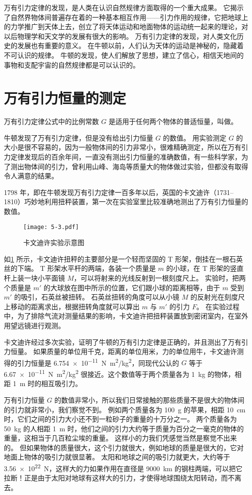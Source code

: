 万有引力定律的发现，是人类在认识自然规律方面取得的一个重大成果。
它揭示了自然界物体间普遍存在着的一种基本相互作用——引力作用的规律，它把地球上的力学推广到天体上去，创立了将天体运动和地面物体的运动统一起来的理论，对以后物理学和天文学的发展有很大的影响。
万有引力定律的发现，对人类文化历史的发展也有重要的意义。
在牛顿以前，人们认为天体的运动是神秘的，隐藏着不可认识的规律。
牛顿的发现，使人们解放了思想，建立了信心，相信天地间的事物和支配宇宙的自然规律都是可以认识的。

\section{万有引力恒量的测定}
万有引力定律公式中的比例常数 $G$ 是适用于任何两个物体的普适恒量，叫做。

牛顿发现了万有引力定律，但是没有给出引力恒量 $G$ 的数值。
用实验测定 $G$ 的大小是很不容易的，因为一般物体间的引力非常小，很难精确测定，所以在万有引力定律发现后的百余年间，一直没有测出引力恒量的准确数值，有一些科学家，为了测出物体间的引力，曾利用山峰、海岛等质量大的物体做过实验，但都没有取得令人满意的结果。

1798 年，即在牛顿发现万有引力定律一百多年以后，英国的卡文迪许（1731--1810）巧妙地利用扭秤装置，第一次在实验室里比较准确地测出了万有引力恒量的数值。

\begin{figure}
	\texttt{[image: 5-3.pdf]}
	\caption{卡文迪许实验示意图}\label{fig:5-3}
\end{figure}

如\cref{fig:5-3} 所示，卡文迪许扭秤的主要部分是一个轻而坚固的 T 形架，倒挂在一根石英丝的下端。
T 形架水平杆的两端，各装一个质量是 $m$ 的小球，在 T 形架的竖直杆上装一块小平面镜 $M$，可以将射来的光线反射到一根刻度尺上。
实验时，把两个质量是 $m'$ 的大球放在图中所示的位置，它们跟小球的距离相等，由于 $m$ 受到 $m'$ 的吸引，石英丝被扭转。
石英丝扭转的角度可以从小镜 $M$ 的反射光在刻度尺上移动的距离求出，根据扭转角度就可以算出 $m$ 与 $m'$ 的引力 $F$。
在实验过程中，为了排除气流对测量结果的影响，卡文迪许把扭秤装置放到密闭室内，在室外用望远镜进行观测。

卡文迪许经过多次实验，证明了牛顿的万有引力定律是正确的，并且测出了万有引力恒量。
如果质量的单位用千克，距离的单位用米，力的单位用牛，卡文迪许测得的引力恒量是 \qty{6.754e-11}{N.m^2/kg^2}，同现代公认的 $G$ 等于 \qty{6.67e-11}{N.m^2/kg^2} 很接近。这个数值等于两个质量各为 \qty{1}{kg} 的物体，相距 \qty{1}{m} 时的相互吸引力。

万有引力恒量 $G$ 的数值非常小，所以我们日常接触的那些质量不是很大的物体间的引力就非常小，我们察觉不到。
例如两个质量各为 \qty{100}{g} 的苹果，相距 \qty{10}{cm} 时，它们之间的引力大小还不到一粒砂子的重量的十万分之一。
两个质量各为 \qty{50}{kg} 的人相距 \qty{1}{m} 时，他们之间的引力大约等于质量为百分之一毫克的物体的重量，这相当于几百粒尘埃的重量。
这样小的力我们凭感觉当然是察觉不出来的。
但如果物体的质量很大，这个引力就很大，例如地球的质量是很大的，它对地面上物体的吸引力就很显著。
太阳和地球之间的吸引力就更大，大约等于 \qty{3.56e22}{N}，这样大的力如果作用在直径是 \qty{9000}{km} 的钢柱两端，可以把它拉断！正是由于太阳对地球有这样大的引力，才使得地球围绕太阳转动，而不离去。

